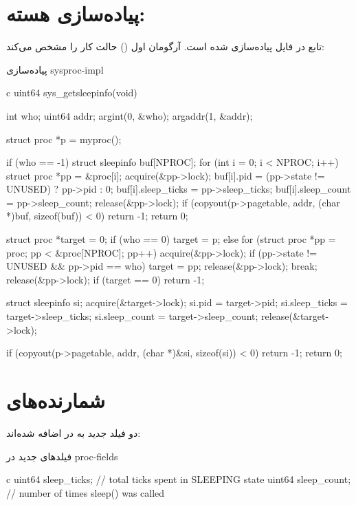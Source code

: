 \documentclass[code]{amznotes-fa}
\begin{document}
\section{پیاده‌سازی هسته: }

تابع  در فایل  پیاده‌سازی شده است. آرگومان اول () حالت کار را مشخص می‌کند:

\begin{codebox}{پیاده‌سازی }{sysproc-impl}
    \begin{amzcode}{c}
uint64
sys_getsleepinfo(void)
{
  int who;
  uint64 addr;
  argint(0, &who);
  argaddr(1, &addr);

  struct proc *p = myproc();

  if (who == -1) {
    struct sleepinfo buf[NPROC];
    for (int i = 0; i < NPROC; i++) {
      struct proc *pp = &proc[i];
      acquire(&pp->lock);
      buf[i].pid         = (pp->state != UNUSED) ? pp->pid : 0;
      buf[i].sleep_ticks = pp->sleep_ticks;
      buf[i].sleep_count = pp->sleep_count;
      release(&pp->lock);
    }
    if (copyout(p->pagetable, addr, (char *)buf, sizeof(buf)) < 0)
      return -1;
    return 0;
  }

  struct proc *target = 0;
  if (who == 0) {
    target = p;
  } else {
    for (struct proc *pp = proc; pp < &proc[NPROC]; pp++) {
      acquire(&pp->lock);
      if (pp->state != UNUSED && pp->pid == who) {
        target = pp;
        release(&pp->lock);
        break;
      }
      release(&pp->lock);
    }
    if (target == 0)
      return -1;
  }

  struct sleepinfo si;
  acquire(&target->lock);
  si.pid         = target->pid;
  si.sleep_ticks = target->sleep_ticks;
  si.sleep_count = target->sleep_count;
  release(&target->lock);

  if (copyout(p->pagetable, addr, (char *)&si, sizeof(si)) < 0)
    return -1;
  return 0;
}
    \end{amzcode}
\end{codebox}

\section{شمارنده‌های }

دو فیلد جدید به  در  اضافه شده‌اند:

\begin{codebox}{فیلدهای جدید در }{proc-fields}
    \begin{amzcode}{c}
uint64 sleep_ticks; // total ticks spent in SLEEPING state
uint64 sleep_count; // number of times sleep() was called
    \end{amzcode}
\end{codebox}
\end{document}
